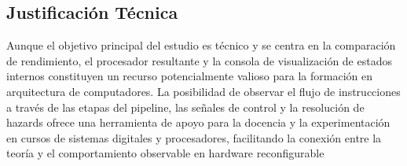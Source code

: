 \subsection{Justificación Técnica} 
Aunque el objetivo principal del estudio es técnico y se centra en la comparación de rendimiento, el procesador resultante y la consola de visualización de estados internos constituyen un recurso potencialmente valioso para la formación en arquitectura de computadores. La posibilidad de observar el flujo de instrucciones a través de las etapas del pipeline, las señales de control y la resolución de hazards ofrece una herramienta de apoyo para la docencia y la experimentación en cursos de sistemas digitales y procesadores, facilitando la conexión entre la teoría y el comportamiento observable en hardware reconfigurable









